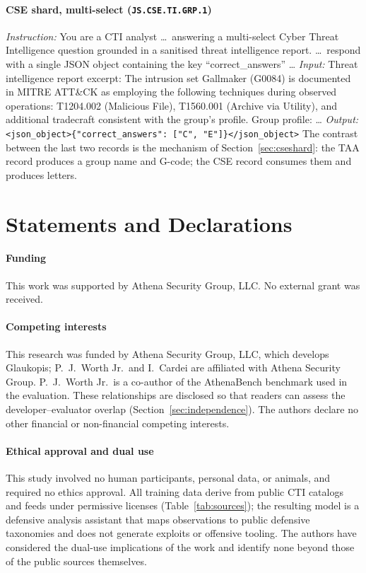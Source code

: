 \documentclass[twocolumn]{svjour3}
\begin{document}
\begin{appendix}
\paragraph{CSE shard, multi-select (\texttt{JS.CSE.TI.GRP.1})}
\emph{Instruction:} You are a CTI analyst \ldots\ answering a multi-select Cyber Threat Intelligence question grounded in a sanitised threat intelligence report. \ldots\ respond with a single JSON object containing the key ``correct\_answers'' \ldots
\emph{Input:} Threat intelligence report excerpt: The intrusion set Gallmaker (G0084) is documented in MITRE ATT\&CK as employing the following techniques during observed operations: T1204.002 (Malicious File), T1560.001 (Archive via Utility), and additional tradecraft consistent with the group's profile. Group profile: \ldots
\emph{Output:} \texttt{<json\_object>\{"correct\_answers": ["C", "E"]\}</json\_object>}
The contrast between the last two records is the mechanism of Section~\ref{sec:cseshard}: the TAA record produces a group name and G-code; the CSE record consumes them and produces letters.
\end{appendix}

\section*{Statements and Declarations}
\paragraph{Funding}
This work was supported by Athena Security Group, LLC. No external grant was received.

\paragraph{Competing interests}
This research was funded by Athena Security Group, LLC, which develops Glaukopis; P.~J.~Worth Jr.\ and I.~Cardei are affiliated with Athena Security Group. P.~J.~Worth Jr.\ is a co-author of the AthenaBench benchmark used in the evaluation. These relationships are disclosed so that readers can assess the developer--evaluator overlap (Section~\ref{sec:independence}). The authors declare no other financial or non-financial competing interests.

\paragraph{Ethical approval and dual use}
This study involved no human participants, personal data, or animals, and required no ethics approval. All training data derive from public CTI catalogs and feeds under permissive licenses (Table~\ref{tab:sources}); the resulting model is a defensive analysis assistant that maps observations to public defensive taxonomies and does not generate exploits or offensive tooling. The authors have considered the dual-use implications of the work and identify none beyond those of the public sources themselves.
\end{document}
